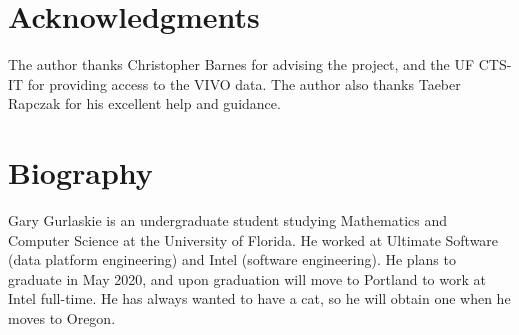 \documentclass[12pt]{article}
\begin{document}
\section*{Acknowledgments}
The author thanks Christopher Barnes for advising the project, and the UF CTS-IT for providing access to the VIVO data. The author also thanks Taeber Rapczak for his excellent help and guidance.

\section*{Biography}
Gary Gurlaskie is an undergraduate student studying Mathematics and Computer Science at the University of Florida. He worked at Ultimate Software (data platform engineering) and Intel (software engineering). He plans to graduate in May 2020, and upon graduation will move to Portland to work at Intel full-time. He has always wanted to have a cat, so he will obtain one when he moves to Oregon.
\end{document}
